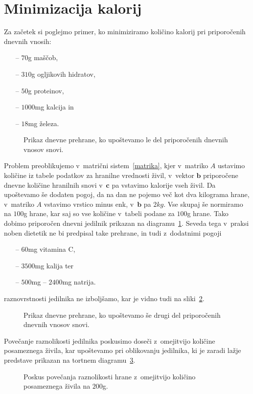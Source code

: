 \documentclass[a4paper,pdftex,12pt]{article} %
\renewcommand{\vec}[1]{\boldsymbol{\mathbf{#1}}}
\numberwithin{equation}{section} %
\numberwithin{figure}{section} %
\numberwithin{table}{section} %
\begin{document}
\section{Minimizacija kalorij}
Za začetek si poglejmo primer, ko minimiziramo količino kalorij pri priporočenih dnevnih
vnosih:
\begin{itemize}\label{tabela1}
    \item[--]$70$g maščob,
    \item[--]$310$g ogljikovih hidratov,
    \item[--]$50$g proteinov,
    \item[--]$1000$mg kalcija in
    \item[--]$18$mg železa.
\end{itemize}
\begin{figure}    
    
    \caption{Prikaz dnevne prehrane, ko upoštevamo le del priporočenih dnevnih vnosov 
    snovi.}
    \label{graf1}
\end{figure}

Problem preoblikujemo v~matrični sistem~\ref{matrika}, kjer v~matriko $A$ ustavimo količine 
iz tabele podatkov za hranilne vrednosti živil, v~vektor $\vec{b}$ priporočene dnevne 
količine hranilnih snovi v~$\vec{c}$ pa vstavimo kalorije vseh živil. Da upoštevamo še
dodaten pogoj, da na dan ne pojemo več kot dva kilograma hrane, v~matriko $A$ vstavimo
vrstico minus enk, v~$\vec{b}$ pa $2kg$. Vse skupaj še normiramo na $100$g hrane, kar
saj so vse količine v~tabeli podane za $100$g hrane. Tako dobimo priporočen dnevni jedilnik
prikazan na diagramu~\ref{graf1}. Seveda tega v~praksi noben dietetik ne bi predpisal take 
prehrane, in tudi z~dodatnimi pogoji
\begin{itemize}
    \item[--]$60$mg vitamina C,
    \item[--]$3500$mg kalija ter
    \item[--]$500$mg -- $2400$mg natrija.
\end{itemize}
raznovrstnosti jedilnika ne izboljšamo, kar je vidno tudi na sliki~\ref{graf2}.
\begin{figure}    
    
    \caption{Prikaz dnevne prehrane, ko upoštevamo še drugi del priporočenih dnevnih vnosov 
    snovi.}
    \label{graf2}
\end{figure}
Povečanje raznolikosti jedilnika poskusimo doseči z~omejitvijo količine 
posameznega živila, kar upoštevamo pri oblikovanju jedilnika, ki je zaradi lažje predstave
prikazan na tortnem diagramu~\ref{graf3}.
\begin{figure}    
    
    \caption{Poskus povečanja raznolikosti hrane z~omejitvijo količino posameznega živila
    na $200$g.}
    \label{graf3}
\end{figure}
\end{document}

